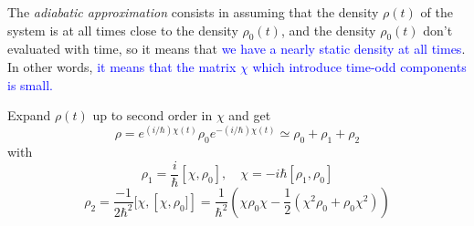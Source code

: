   The \textit{adiabatic approximation} consists in assuming that the density $\rho(t)$ of the system is at all times close to the density $\rho_0(t)$, and the density $\rho_0(t)$ don't evaluated with time, so it means that \textcolor{blue}{we have a nearly static density at all times}. In other words, \textcolor{blue}{it means that the matrix $\chi$ which introduce time-odd components is small.}

  Expand $\rho(t)$ up to second order in $\chi$ and get
  \begin{equation}
    \rho=e^{(i/\hbar)\chi(t)}\rho_{0}e^{-(i/\hbar)\chi(t)} \simeq \rho_0 + \rho_1 + \rho_2  \label{tdhf25}
  \end{equation}
  with 
  \begin{equation}
    \rho_1 = \frac{i}{\hbar}[\chi, \rho_0], \quad \chi=-i\hbar[\rho_1,\rho_0] \label{tdhf26}
  \end{equation}
  \begin{equation}
    \rho_2=\frac{-1}{2\hbar^2} [ \chi,\left[ \chi,\rho_0] \right] = \frac{1}{\hbar^2}\left( \chi\rho_0\chi - \frac{1}{2}(\chi^2\rho_0+\rho_0\chi^2) \right) \label{tdhf27}
  \end{equation}
